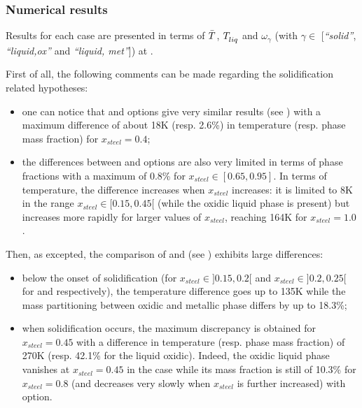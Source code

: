 \subsubsection{Numerical results} \label{sect:numres}

Results for each case are presented in terms of $\bar{\temperature{}}$, $\temperature{liq}$ and $\omega_\gamma$ (with $\gamma \in $ [\textit{``solid''}, \textit{``liquid,ox''} and \textit{``liquid, met''}]) at .

First of all, the following comments can be made regarding the solidification related hypotheses:
\begin{itemize}
 \item one can notice that  and  options give very similar results (see ) with a maximum difference of about 18K (resp. 2.6\%) in temperature (resp. phase mass fraction) for $x_{steel}=0.4$;
 \item the differences between  and  options are also very limited in terms of phase fractions with a maximum of 0.8\% for $x_{steel}\in[0.65, 0.95]$. In terms of temperature, the difference increases when $x_{steel}$ increases: it is limited to 8K in the range $x_{steel}\in[0.15, 0.45[$ (while the oxidic liquid phase is present) but increases more rapidly for larger values of $x_{steel}$, reaching 164K for $x_{steel}=1.0$.
\end{itemize}
Then, as excepted, the comparison of  and  (see ) exhibits large differences:
\begin{itemize}
 \item below the onset of solidification (for $x_{steel}\in]0.15, 0.2[$ and $x_{steel}\in]0.2, 0.25[$ for  and  respectively), the temperature difference goes up to 135K while the mass partitioning between oxidic and metallic phase differs by up to 18.3\%;
 \item when solidification occurs, the maximum discrepancy is obtained for $x_{steel}=0.45$ with a difference in temperature (resp. phase mass fraction) of 270K (resp. 42.1\% for the liquid oxidic). Indeed, the oxidic liquid phase vanishes at $x_{steel}=0.45$ in the  case while its mass fraction is still of 10.3\% for $x_{steel}=0.8$ (and decreases very slowly when $x_{steel}$ is further increased) with  option.
\end{itemize}
